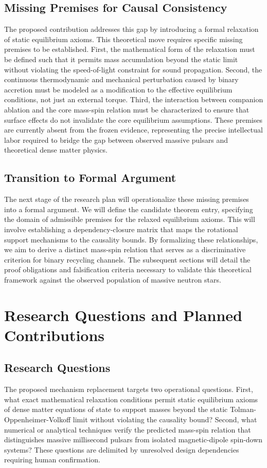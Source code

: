 \documentclass[conference]{IEEEtran}
\begin{document}
\subsection{Missing Premises for Causal Consistency}
The proposed contribution addresses this gap by introducing a formal relaxation of static equilibrium axioms. This theoretical move requires specific missing premises to be established. First, the mathematical form of the relaxation must be defined such that it permits mass accumulation beyond the static limit without violating the speed-of-light constraint for sound propagation. Second, the continuous thermodynamic and mechanical perturbation caused by binary accretion must be modeled as a modification to the effective equilibrium conditions, not just an external torque. Third, the interaction between companion ablation and the core mass-spin relation must be characterized to ensure that surface effects do not invalidate the core equilibrium assumptions. These premises are currently absent from the frozen evidence, representing the precise intellectual labor required to bridge the gap between observed massive pulsars and theoretical dense matter physics.

\subsection{Transition to Formal Argument}
The next stage of the research plan will operationalize these missing premises into a formal argument. We will define the candidate theorem entry, specifying the domain of admissible premises for the relaxed equilibrium axioms. This will involve establishing a dependency-closure matrix that maps the rotational support mechanisms to the causality bounds. By formalizing these relationships, we aim to derive a distinct mass-spin relation that serves as a discriminative criterion for binary recycling channels. The subsequent sections will detail the proof obligations and falsification criteria necessary to validate this theoretical framework against the observed population of massive neutron stars.

\section{Research Questions and Planned Contributions}
\subsection{Research Questions}
The proposed mechanism replacement targets two operational questions. First, what exact mathematical relaxation conditions permit static equilibrium axioms of dense matter equations of state to support masses beyond the static Tolman-Oppenheimer-Volkoff limit without violating the causality bound? Second, what numerical or analytical techniques verify the predicted mass-spin relation that distinguishes massive millisecond pulsars from isolated magnetic-dipole spin-down systems? These questions are delimited by unresolved design dependencies requiring human confirmation.~\cite{cite_55957f4ce67bd972,cite_1e5d552669fc0c56}
\end{document}
